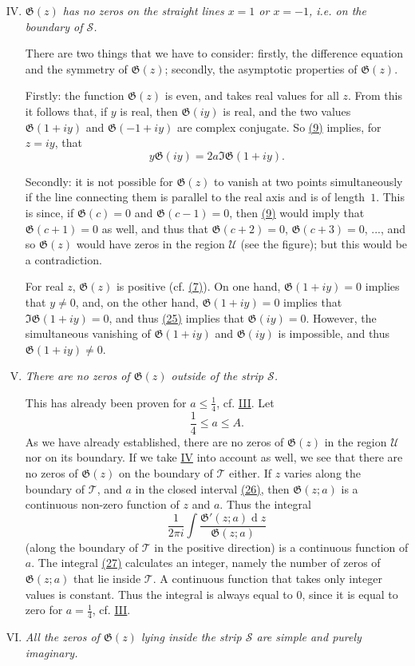 \documentclass{article}
\theoremstyle{plain}
\newcommand{\dd}{\operatorname{d}\!}
\newcommand{\GG}{\mathfrak{G}}
\newcommand{\UU}{\mathscr{U}}
\newcommand{\TT}{\mathscr{T}}
\renewcommand{\SS}{\mathscr{S}}
\renewcommand{\leq}{\leqslant}
\newcommand{\oldpage}[1]{\marginpar{\footnotesize$\Big\vert$ \textit{p.~#1}}}
\begin{document}
\begin{enumerate}[I.]
\setcounter{enumi}{3}
  \item \emph{$\GG(z)$ has no zeros on the straight lines $x=1$ or $x=-1$, i.e. on the boundary of $\SS$.}
    \label{IV}

    There are two things that we have to consider:
\oldpage{312}
    firstly, the difference equation and the symmetry of $\GG(z)$; secondly, the asymptotic properties of $\GG(z)$.

    Firstly:
    the function $\GG(z)$ is even, and takes real values for all $z$.
    From this it follows that, if $y$ is real, then $\GG(iy)$ is real, and the two values $\GG(1+iy)$ and $\GG(-1+iy)$ are complex conjugate.
    So \hyperref[9]{(9)} implies, for $z=iy$, that
    \[
    \label{25}
      y\GG(iy) = 2a\Im\GG(1+iy).
    \tag{25}
    \]

    Secondly:
    it is not possible for $\GG(z)$ to vanish at two points simultaneously if the line connecting them is parallel to the real axis and is of length~$1$.
    This is since, if $\GG(c)=0$ and $\GG(c-1)=0$, then \hyperref[9]{(9)} would imply that $\GG(c+1)=0$ as well, and thus that $\GG(c+2)=0$, $\GG(c+3)=0$, ..., and so $\GG(z)$ would have zeros in the region $\UU$ (see the figure); but this would be a contradiction.

    For real $z$, $\GG(z)$ is positive (cf. \hyperref[7]{(7)}).
    On one hand, $\GG(1+iy)=0$ implies that $y\neq0$, and, on the other hand, $\GG(1+iy)=0$ implies that $\Im\GG(1+iy)=0$, and thus \hyperref[25]{(25)} implies that $\GG(iy)=0$.
    However, the simultaneous vanishing of $\GG(1+iy)$ and $\GG(iy)$ is impossible, and thus $\GG(1+iy)\neq0$.
  \item \emph{There are no zeros of $\GG(z)$ outside of the strip $\SS$.}
    \label{V}

    This has already been proven for $a\leq\frac14$, cf. \hyperref[III]{III}.
    Let
    \[
    \label{26}
      \frac14 \leq a \leq A.
    \tag{26}
    \]
    As we have already established, there are no zeros of $\GG(z)$ in the region $\UU$ nor on its boundary.
    If we take \hyperref[IV]{IV} into account as well, we see that there are no zeros of $\GG(z)$ on the boundary of $\TT$ either.
    If $z$ varies along the boundary of $\TT$, and $a$ in the closed interval \hyperref[26]{(26)}, then $\GG(z;a)$ is a continuous non-zero function of $z$ and $a$.
    Thus the integral
    \[
    \label{27}
      \frac{1}{2\pi i} \int \frac{\GG'(z;a)\dd z}{\GG(z;a)}
    \tag{27}
    \]
    (along the boundary of $\TT$ in the positive direction) is a continuous function of $a$.
    The integral \hyperref[27]{(27)} calculates an integer, namely the number of zeros of $\GG(z;a)$ that lie inside $\TT$.
    A continuous function that takes only integer values is constant.
    Thus the integral is always equal to $0$, since it is equal to zero for $a=\frac14$, cf. \hyperref[III]{III}.
\oldpage{313}
  \item \emph{All the zeros of $\GG(z)$ lying inside the strip $\SS$ are simple and purely imaginary.}
    \label{VI}


\end{enumerate}
\end{document}
